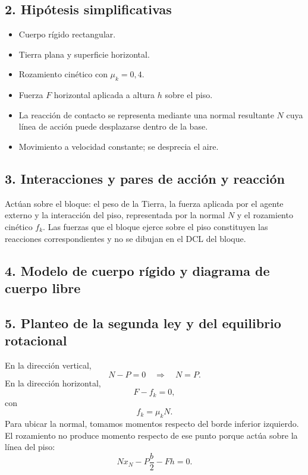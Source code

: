 \documentclass[12pt]{article}
\newcommand{\paso}[2]{%
  \subsection*{\color{AzulFisica}#1. #2}%
}
\begin{document}
\paso{2}{Hipótesis simplificativas}
\begin{itemize}[itemsep=2pt]
  \item Cuerpo rígido rectangular.
  \item Tierra plana y superficie horizontal.
  \item Rozamiento cinético con $\mu_k=0,4$.
  \item Fuerza $F$ horizontal aplicada a altura $h$ sobre el piso.
  \item La reacción de contacto se representa mediante una normal resultante $N$ cuya línea de acción puede desplazarse dentro de la base.
  \item Movimiento a velocidad constante; se desprecia el aire.
\end{itemize}

\paso{3}{Interacciones y pares de acción y reacción}
Actúan sobre el bloque: el peso de la Tierra, la fuerza aplicada por el agente externo y la interacción del piso, representada por la normal $N$ y el rozamiento cinético $f_k$. Las fuerzas que el bloque ejerce sobre el piso constituyen las reacciones correspondientes y no se dibujan en el DCL del bloque.

\paso{4}{Modelo de cuerpo rígido y diagrama de cuerpo libre}
\begin{center}
\end{center}

\paso{5}{Planteo de la segunda ley y del equilibrio rotacional}
En la dirección vertical,
\[
N-P=0\quad\Rightarrow\quad N=P.
\]
En la dirección horizontal,
\[
F-f_k=0,
\]
con
\[
f_k=\mu_kN.
\]
Para ubicar la normal, tomamos momentos respecto del borde inferior izquierdo. El rozamiento no produce momento respecto de ese punto porque actúa sobre la línea del piso:
\[
Nx_N-P\frac{b}{2}-Fh=0.
\]
\end{document}

